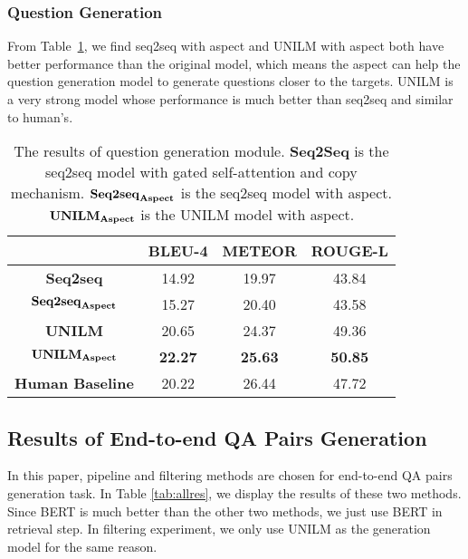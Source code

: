 \subsubsection{Question Generation}

From Table~\ref{tab:QG}, we find seq2seq with aspect and UNILM with aspect both have better performance than the original model, which means the aspect can help the question generation model to generate questions closer to the targets.
UNILM is a very strong model whose performance is much better than seq2seq and similar to human's.
\begin{table}[th]
\scriptsize
\centering
\begin{tabular}{cccc}
\toprule[1.5pt]
\textbf{} & \textbf{BLEU-4} & \textbf{METEOR} & \textbf{ROUGE-L} \\ 
\midrule
\textbf{Seq2seq} & 14.92 & 19.97 & 43.84 \\ 
$\text{\textbf{Seq2seq}}_{\text{\textbf{Aspect}}}$ & 15.27 & 20.40 & 43.58 \\ 
\midrule
\textbf{UNILM} & 20.65 & 24.37 & 49.36 \\ 
$\text{\textbf{UNILM}}_{\text{\textbf{Aspect}}}$ & \textbf{22.27} & \textbf{25.63} & \textbf{50.85} \\ 
\midrule
\textbf{Human Baseline} & 20.22 & 26.44 & 47.72\\
\bottomrule[1.5pt]
\end{tabular}
\caption{\label{tab:QG} The results of question generation module. \textbf{Seq2Seq} is the seq2seq model with gated self-attention and copy mechanism. $\text{\textbf{Seq2seq}}_{\text{\textbf{Aspect}}}$ is the seq2seq model with aspect. $\text{\textbf{UNILM}}_{\text{\textbf{Aspect}}}$ is the UNILM model with aspect.}
\end{table}

\subsection{Results of End-to-end QA Pairs Generation}
\label{sec:end2end}
In this paper, pipeline and filtering methods are chosen for end-to-end QA pairs generation task.
In Table \ref{tab:allres}, we display the results of these two methods.
Since BERT is much better than the other two methods, we just use BERT in retrieval step. 
In filtering experiment, we only use UNILM as the generation model for the same reason.


